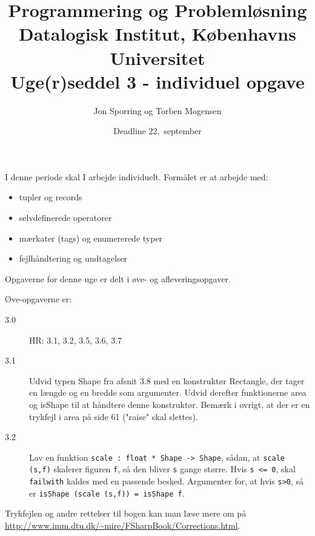\documentclass[a4paper,12pt]{article}
\title{Programmering og Problemløsning\\Datalogisk Institut,
  Københavns Universitet\\Uge(r)seddel 3 - individuel opgave}
\author{Jon Sporring og Torben Mogensen}
\date{Deadline  22.\ september}
\begin{document}
\maketitle

I denne periode skal I arbejde individuelt. Formålet er at arbejde med:
\begin{itemize}
\item tupler og records
\item selvdefinerede operatorer
\item mærkater (tags) og enumererede typer
\item fejlhåndtering og undtagelser
\end{itemize}

Opgaverne for denne uge er delt i øve- og afleveringsopgaver. 

Øve-opgaverne er:
\begin{description}
\item[3.0] HR: 3.1, 3.2, 3.5, 3.6, 3.7
\item[3.1] Udvid typen Shape fra afsnit 3.8 med en konstruktør
  Rectangle, der tager en længde og en bredde som argumenter.  Udvid
  derefter funktionerne area og isShape til at håndtere denne
  konstruktør. Bemærk i øvrigt, at der er en trykfejl i area på side
  61 ("raise" skal slettes).
\item[3.2] Lav en funktion \lstinline|scale : float * Shape -> Shape|, sådan, at \lstinline|scale (s,f)| skalerer figuren \lstinline|f|, så den bliver \lstinline|s| gange større. Hvis \lstinline|s <= 0|, skal \lstinline|failwith| kaldes med en passende besked.  Argumenter for, at hvis \lstinline|s>0|, så er \lstinline|isShape (scale (s,f)) = isShape f|. 
\end{description}
Trykfejlen og andre rettelser til bogen kan man læse mere om på \url{http://www.imm.dtu.dk/~mire/FSharpBook/Corrections.html}.
\end{document}
